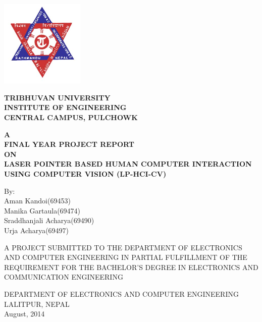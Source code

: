 \begin{titlepage}
    \begin{center}
        \vspace*{0.5cm}
        
        \begin{center}
        \includegraphics[width=0.3\textwidth]{logo}
        \end{center}
        
        \large
        {\textbf{TRIBHUVAN UNIVERSITY} \\
        \textbf{INSTITUTE OF ENGINEERING} \\
        \textbf{CENTRAL CAMPUS, PULCHOWK}\\}
        
        \vspace{1cm}
        
        \normalsize
        \textbf{A \\FINAL YEAR PROJECT REPORT\\ ON\\
       LASER POINTER BASED HUMAN­ COMPUTER INTERACTION USING COMPUTER VISION (LP­-HCI-­CV)}

		\vspace{1cm}
        
        By:\\
        Aman Kandoi(69453)\\
Manika Gartaula(69474)\\
Sraddhanjali Acharya(69490)\\
Urja Acharya(69497)\\

        
        \vspace{1cm}
        
        A PROJECT SUBMITTED TO THE DEPARTMENT OF ELECTRONICS AND
COMPUTER ENGINEERING IN PARTIAL FULFILLMENT OF THE
REQUIREMENT FOR THE BACHELOR’S DEGREE IN
ELECTRONICS AND COMMUNICATION ENGINEERING\\
    \vspace{2cm}

DEPARTMENT OF ELECTRONICS AND COMPUTER ENGINEERING\\
LALITPUR, NEPAL\\
August, 2014

        
        
    \end{center}
\end{titlepage}